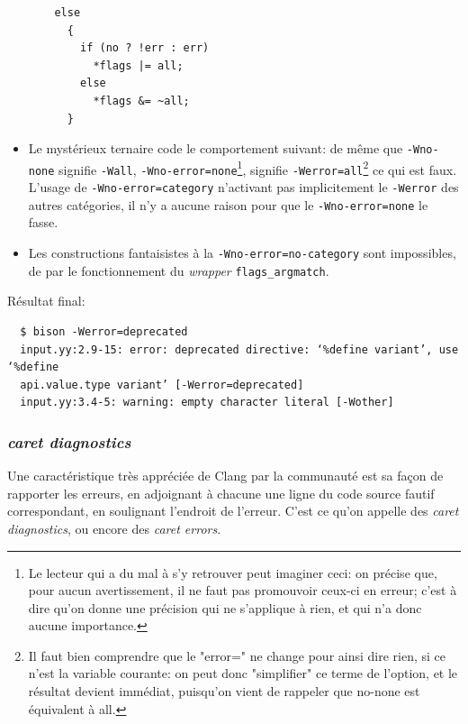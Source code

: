 \documentclass[a4paper,11pt,twoside,final]{article}
\begin{document}
\begin{itemize}
  \begin{verbatim}
    else
      {
        if (no ? !err : err)
          *flags |= all;
        else
          *flags &= ~all;
      }
  \end{verbatim}


    \item Le mystérieux ternaire code le comportement suivant: de même que
      \texttt{-Wno-none} signifie \texttt{-Wall},
      \texttt{-Wno-error=none}\footnote{%
        Le lecteur qui a du mal à s'y retrouver peut imaginer ceci: on précise
        que, pour aucun avertissement, il ne faut pas promouvoir ceux-ci en
        erreur; c'est à dire qu'on donne une précision qui ne s'applique à
      rien, et qui n'a donc aucune importance.}, signifie
      \texttt{-Werror=all}\footnote{Il faut bien comprendre que le "error=" ne
        change pour ainsi dire rien, si ce n'est la variable courante: on peut
        donc "simplifier" ce terme de l'option, et le résultat devient
      immédiat, puisqu'on vient de rappeler que no-none est équivalent à all.}
      ce qui est faux. L'usage de \texttt{-Wno-error=category} n'activant pas
      implicitement le
      \texttt{-Werror} des autres catégories, il n'y a aucune raison pour que
      le \texttt{-Wno-error=none} le fasse.
    \item Les constructions fantaisistes à la \texttt{-Wno-error=no-category}
      sont impossibles, de par le fonctionnement du \textit{wrapper}
      \texttt{flags\_argmatch}.
  \end{itemize}


  Résultat final:


  \begin{verbatim}
  $ bison -Werror=deprecated
  input.yy:2.9-15: error: deprecated directive: ‘%define variant’, use ‘%define
  api.value.type variant’ [-Werror=deprecated]
  input.yy:3.4-5: warning: empty character literal [-Wother]
  \end{verbatim}

  \subsubsection{\textit{caret diagnostics}}

  Une caractéristique très appréciée de Clang par la communauté est sa façon de
  rapporter les erreurs, en adjoignant à chacune une ligne du code source
  fautif correspondant, en soulignant l'endroit de l'erreur. C'est ce qu'on
  appelle des \textit{caret diagnostics}, ou encore des \textit{caret errors}.
\end{document}
